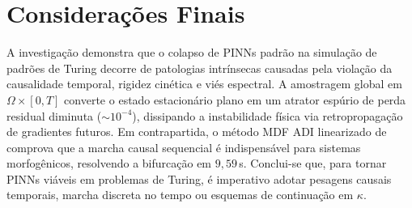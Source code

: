 \documentclass[a4paper, 12pt, twoside]{article}
\begin{document}
\section{Considerações Finais}

A investigação demonstra que o colapso de PINNs padrão na simulação de padrões de Turing decorre de patologias intrínsecas causadas pela violação da causalidade temporal, rigidez cinética e viés espectral. A amostragem global em $\Omega \times [0, T]$ converte o estado estacionário plano em um atrator espúrio de perda residual diminuta ($\sim 10^{-4}$), dissipando a instabilidade física via retropropagação de gradientes futuros. Em contrapartida, o método MDF ADI linearizado de \textcite{pereira2019} comprova que a marcha causal sequencial é indispensável para sistemas morfogênicos, resolvendo a bifurcação em $9{,}59$\,s. Conclui-se que, para tornar PINNs viáveis em problemas de Turing, é imperativo adotar pesagens causais temporais, marcha discreta no tempo ou esquemas de continuação em $\kappa$.

\renewcommand*{\bibfont}{\footnotesize}
\setlength{\bibitemsep}{0pt}
\setlength{\bibparsep}{-1pt}
\begin{refcontext}[sorting=none]
\printbibliography
\end{refcontext}
\end{document}
